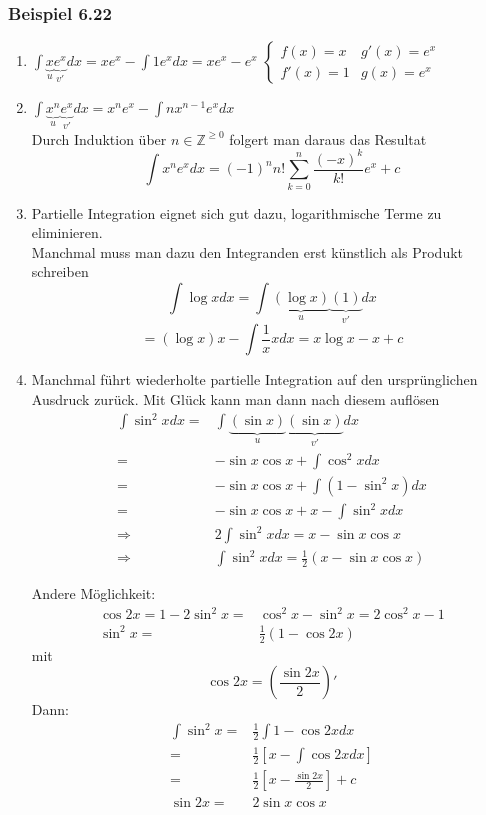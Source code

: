 \subsubsection*{Beispiel 6.22}
\begin{enumerate}
\item $\int {\underbrace x_u\underbrace {{e^x}}_{v'}dx = x{e^x} - \int {1{e^x}dx} } =x e^x - e^x$
$\left\{\begin{array}{cc} f(x)=x & g'(x)=e^x \\ f'(x)=1 & g(x)=e^x\end{array}\right.$

\item $\int {\underbrace {{x^n}}_u\underbrace {{e^x}}_{v'}dx = {x^n}{e^x} - \int {n{x^{n - 1}}{e^x}dx} } $\\
Durch Induktion über $n\in\mathbb{Z}^{\geq 0}$ folgert man daraus das Resultat \[\int {{x^n}{e^x}dx = {{( - 1)}^n}n!\sum\limits_{k = 0}^n {\frac{{{{( - x)}^k}}}{{k!}}{e^x} + c} } \]

\item Partielle Integration eignet sich gut dazu, logarithmische Terme zu eliminieren.\\
Manchmal muss man dazu den Integranden erst künstlich als Produkt schreiben
\[\int {\log xdx = \int {\underbrace {(\log x)}_u\underbrace {(1)}_{v'}dx} } \]
\[ = (\log x)x - \int {\frac{1}{x}} xdx = x\log x - x + c\]

\item Manchmal führt wiederholte partielle Integration auf den ursprünglichen Ausdruck zurück. Mit Glück kann man dann nach diesem auflösen
\begin{align*}
\int {{{\sin }^2}xdx} =&\int {\underbrace {(\sin x)}_u\underbrace {(\sin x)}_{v'}dx}  \\
 =&- \sin x\cos x + \int {{{\cos }^2}xdx}\\
 =&- \sin x\cos x + \int {(1 - {{\sin }^2}x)dx}\\
 =&- \sin x\cos x + x - \int {{{\sin }^2}xdx} \\
\Rightarrow&2\int {{{\sin }^2}xdx = x - \sin x\cos x} \\
\Rightarrow&\int {{{\sin }^2}xdx = \frac{1}{2}\left( {x - \sin x\cos x}  \right)}
\end{align*}


Andere Möglichkeit:
\begin{align*}
\cos 2x = 1-2\sin^2x=&\cos^2x-\sin^2x=2\cos^2x-1\\
\sin^2x=&\frac{1}{2}(1-\cos 2x)
\end{align*}
mit
\[\cos 2x=\left(\frac{\sin 2x}{2} \right)'\]
Dann:
\begin{align*}
\int{\sin^2 x}=&\frac{1}{2}\int{1-\cos 2x dx}\\
=&\frac{1}{2}\left[ x-\int{\cos 2x dx}\right]\\
=&\frac{1}{2}\left[ x-\frac{\sin 2x}{2}\right] +c\\
\sin 2x=&2\sin x\cos x
\end{align*}
\end{enumerate}

